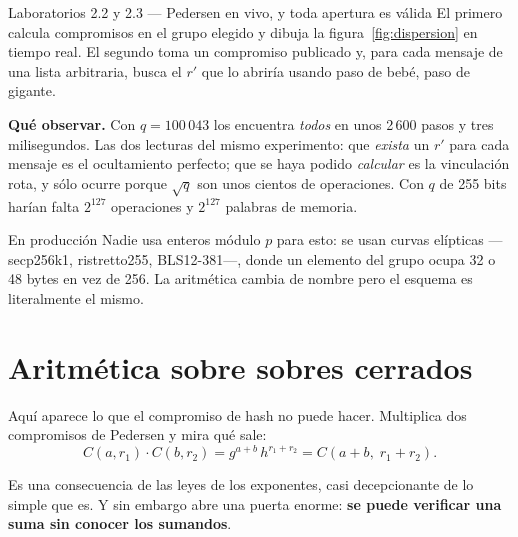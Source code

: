\documentclass[11pt,a4paper]{article}
\theoremstyle{definition}
\theoremstyle{plain}
\theoremstyle{remark}
\begin{document}
\begin{laboratorio}{Laboratorios 2.2 y 2.3 — Pedersen en vivo, y toda apertura es válida}
El primero calcula compromisos en el grupo elegido y dibuja la
figura~\ref{fig:dispersion} en tiempo real. El segundo toma un compromiso
publicado y, para cada mensaje de una lista arbitraria, busca el $r'$ que lo
abriría usando paso de bebé, paso de gigante.

\textbf{Qué observar.} Con $q = 100\,043$ los encuentra \emph{todos} en unos
2\,600 pasos y tres milisegundos. Las dos lecturas del mismo experimento: que
\emph{exista} un $r'$ para cada mensaje es el ocultamiento perfecto; que se haya
podido \emph{calcular} es la vinculación rota, y sólo ocurre porque $\sqrt{q}$
son unos cientos de operaciones. Con $q$ de 255 bits harían falta $2^{127}$
operaciones y $2^{127}$ palabras de memoria.
\end{laboratorio}

\begin{nota}{En producción}
Nadie usa enteros módulo $p$ para esto: se usan curvas elípticas ---secp256k1,
ristretto255, BLS12-381---, donde un elemento del grupo ocupa 32 o 48 bytes en
vez de 256. La aritmética cambia de nombre pero el esquema es literalmente el
mismo.
\end{nota}

\section{Aritmética sobre sobres cerrados}

Aquí aparece lo que el compromiso de hash no puede hacer. Multiplica dos
compromisos de Pedersen y mira qué sale:
\begin{equation}\label{eq:homo}
  C(a, r_1) \cdot C(b, r_2)
  = g^{a+b}\,h^{r_1+r_2}
  = C(a+b,\; r_1+r_2).
\end{equation}

Es una consecuencia de las leyes de los exponentes, casi decepcionante de lo
simple que es. Y sin embargo abre una puerta enorme: \textbf{se puede verificar
una suma sin conocer los sumandos}.
\end{document}

